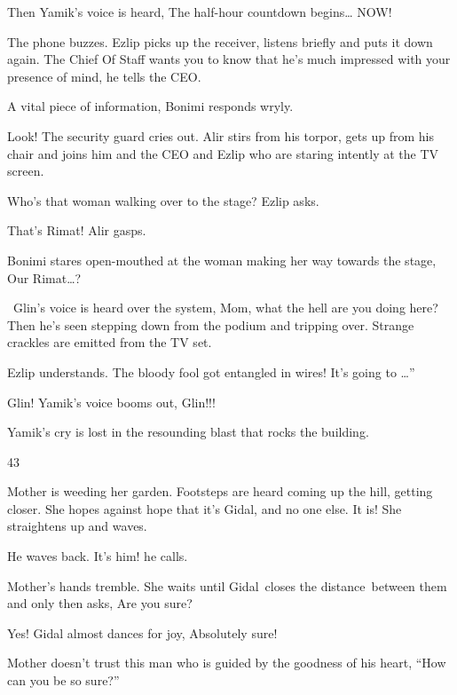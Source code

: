 \documentclass[letterpaper]{article}
\begin{document}
Then Yamik's voice is heard, {\textquotedbl}The half-hour countdown
begins{\dots}{ }NOW!{\textquotedbl}

The phone buzzes. Ezlip picks up the receiver, listens briefly and puts it down again. {\textquotedbl}The Chief Of Staff
wants you to know that he's much impressed with your presence of mind,{\textquotedbl} he tells the CEO.

{\textquotedbl}A vital piece of information,{\textquotedbl} Bonimi responds wryly. 

{\textquotedbl}Look!{\textquotedbl} The security guard cries out. Alir stirs from his torpor, gets up from his chair and
joins him and the CEO and Ezlip who are staring intently at the TV screen. 

{\textquotedbl}Who's that woman walking over to the stage?{\textquotedbl} Ezlip asks. 

{\textquotedbl}That's Rimat!{\textquotedbl} Alir gasps. 

Bonimi stares open-mouthed at the woman making her way towards the stage, {\textquotedbl}Our
Rimat{\dots}?{\textquotedbl}

~Glin's voice is heard over the system, {\textquotedbl}Mom, what the hell are you doing here?{\textquotedbl} Then
he{{}'}s seen stepping down from the podium and tripping over. Strange crackles
are emitted from the TV set.

Ezlip understands. {\textquotedbl}The bloody fool got entangled in wires! It's going to {\dots}''

{\textquotedbl}Glin!{\textquotedbl} Yamik's voice booms{ }out,
{\textquotedbl}Glin!!!{\textquotedbl}

Yamik's cry is lost in the resounding blast that rocks the building.


\bigskip

43 

Mother is weeding her garden. Footsteps are heard coming up the hill, getting closer. She hopes against hope that it's
Gidal, and{ }no one else. It is! She straightens up and waves. 

He waves back. {\textquotedbl}It's him!{\textquotedbl} he calls. 

Mother's hands tremble. She waits until Gidal~closes the distance~between them and only then
asks,{ }{\textquotedbl}Are you sure?{\textquotedbl} 

{\textquotedbl}Yes!{\textquotedbl} Gidal almost dances for joy, {\textquotedbl}Absolutely sure!{\textquotedbl} 

Mother doesn't trust this man who is guided by the goodness of his heart, ``How can you be so sure?'' 
\end{document}
